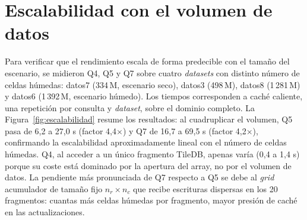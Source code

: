 \FloatBarrier
\section{Escalabilidad con el volumen de datos}\label{escalabilidad}

Para verificar que el rendimiento escala de forma predecible con el tamaño del escenario, se midieron Q4, Q5 y Q7 sobre cuatro \textit{datasets} con distinto número de celdas húmedas: datos7 (334\,M, escenario seco), datos3 (498\,M), datos8 (1\,281\,M) y datos6 (1\,392\,M, escenario húmedo). Los tiempos corresponden a caché caliente, una repetición por consulta y \textit{dataset}, sobre el dominio completo. La Figura~\ref{fig:escalabilidad} resume los resultados: al cuadruplicar el volumen, Q5 pasa de 6,2 a 27,0 s (factor 4,4$\times$) y Q7 de 16,7 a 69,5 s (factor 4,2$\times$), confirmando la escalabilidad aproximadamente lineal con el número de celdas húmedas. Q4, al acceder a un único fragmento TileDB, apenas varía (0,4 a 1,4 s) porque su coste está dominado por la apertura del array, no por el volumen de datos. La pendiente más pronunciada de Q7 respecto a Q5 se debe al \textit{grid} acumulador de tamaño fijo $n_r \times n_c$ que recibe escrituras dispersas en los 20 fragmentos: cuantas más celdas húmedas por fragmento, mayor presión de caché en las actualizaciones.

